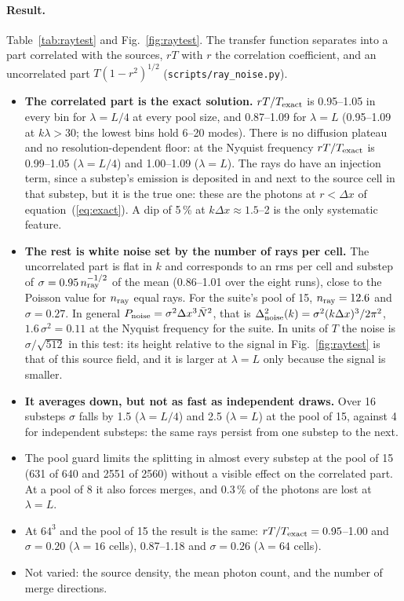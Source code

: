 \documentclass[11pt]{article}
\newcommand{\dx}{\Delta x}
\begin{document}
\paragraph{Result.} Table~\ref{tab:raytest} and Fig.~\ref{fig:raytest}. The transfer function separates into
a part correlated with the sources, $rT$ with $r$ the correlation coefficient, and an uncorrelated part
$T(1-r^2)^{1/2}$ (\texttt{scripts/ray\_noise.py}).
\begin{itemize}
\item \textbf{The correlated part is the exact solution.} $rT/T_{\rm exact}$ is 0.95--1.05 in every bin for
$\lambda=L/4$ at every pool size, and 0.87--1.09 for $\lambda=L$ (0.95--1.09 at $k\lambda>30$; the lowest
bins hold 6--20 modes). There is no diffusion plateau and no resolution-dependent floor: at the Nyquist
frequency $rT/T_{\rm exact}$ is 0.99--1.05 ($\lambda=L/4$) and 1.00--1.09 ($\lambda=L$). The rays do have an
injection term, since a substep's emission is deposited in and next to the source cell in that substep, but
it is the true one: these are the photons at $r<\dx$ of equation~(\ref{eq:exact}). A dip of 5\,\% at
$k\dx\approx1.5$--2 is the only systematic feature.
\item \textbf{The rest is white noise set by the number of rays per cell.} The uncorrelated part is flat in $k$
and corresponds to an rms per cell and substep of $\sigma=0.95\,n_{\rm ray}^{-1/2}$ of the mean (0.86--1.01
over the eight runs), close to the Poisson value for $n_{\rm ray}$ equal rays. For the suite's pool of 15,
$n_{\rm ray}=12.6$ and $\sigma=0.27$. In general $P_{\rm noise}=\sigma^2\dx^3\bar N^2$, that is
$\Delta^2_{\rm noise}(k)=\sigma^2(k\dx)^3/2\pi^2$, $1.6\,\sigma^2=0.11$ at the Nyquist frequency for the
suite. In units of $T$ the noise is $\sigma/\sqrt{512}$ in this test: its height relative to the signal in
Fig.~\ref{fig:raytest} is that of this source field, and it is larger at $\lambda=L$ only because the signal
is smaller.
\item \textbf{It averages down, but not as fast as independent draws.} Over 16 substeps $\sigma$ falls by 1.5
($\lambda=L/4$) and 2.5 ($\lambda=L$) at the pool of 15, against 4 for independent substeps: the same rays
persist from one substep to the next.
\item The pool guard limits the splitting in almost every substep at the pool of 15 (631 of 640 and 2551 of
2560) without a visible effect on the correlated part. At a pool of 8 it also forces merges, and 0.3\,\% of the
photons are lost at $\lambda=L$.
\item At $64^3$ and the pool of 15 the result is the same: $rT/T_{\rm exact}=0.95$--1.00 and $\sigma=0.20$
($\lambda=16$ cells), 0.87--1.18 and $\sigma=0.26$ ($\lambda=64$ cells).
\item Not varied: the source density, the mean photon count, and the number of merge directions.
\end{itemize}
\end{document}
